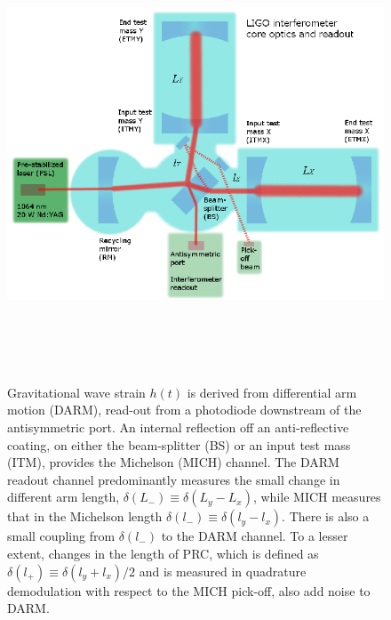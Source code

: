 \begin{figure}
\begin{center}
\includegraphics[height=135mm,width=150mm]{figure1.eps}
\caption{Gravitational wave strain $h(t)$ is derived from differential arm motion (DARM), read-out from a photodiode downstream of the antisymmetric port. An internal reflection off an anti-reflective coating, on either the beam-splitter (BS) or an input test mass (ITM), provides the Michelson (MICH) channel. The DARM readout channel predominantly measures the small change in different arm length, $\delta(L_-) \equiv \delta(L_y - L_x)$, while MICH measures that in the Michelson length $\delta(l_-) \equiv \delta(l_y - l_x)$. There is also a small coupling from $\delta(l_-)$ to the DARM channel. To a lesser extent, changes in the length of PRC, which is defined as $\delta(l_+) \equiv \delta(l_y + l_x)/2$ and is measured in quadrature demodulation with respect to the MICH pick-off, also add noise to DARM.}
\label{arms}
\end{center}
\end{figure}


